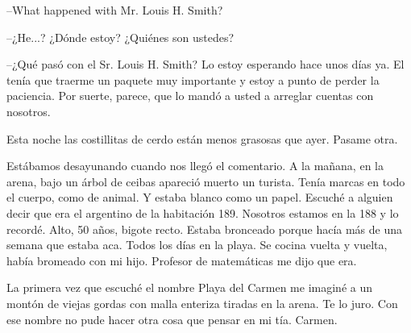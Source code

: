 \documentclass[11pt,twoside,openright,a6paper]{book}
\begin{document}
\vspace{0.5cm}
\hrulefill\hspace{0.2cm} \decofourleft\decofourright \hspace{0.2cm} \hrulefill
\vspace{0.5cm}

\---What happened with Mr. Louis H. Smith?

\---¿He...? ¿Dónde estoy? ¿Quiénes son ustedes?

\---¿Qué pasó con el Sr. Louis H. Smith? Lo estoy esperando hace
unos días ya. El tenía que traerme un paquete muy importante y estoy a
punto de perder la paciencia. Por suerte, parece, que lo mandó a usted a arreglar
cuentas con nosotros.


\vspace{0.5cm}
\hrulefill\hspace{0.2cm} \decofourleft\decofourright \hspace{0.2cm} \hrulefill
\vspace{0.5cm}

Esta noche las costillitas de cerdo están menos grasosas que ayer. Pasame
otra.


\vspace{0.5cm}
\hrulefill\hspace{0.2cm} \decofourleft\decofourright \hspace{0.2cm} \hrulefill
\vspace{0.5cm}

Estábamos desayunando cuando nos llegó el comentario. A la mañana, en la
arena, bajo un árbol de ceibas apareció muerto un turista. Tenía marcas
en todo el cuerpo, como de animal. Y estaba blanco como un papel. Escuché
a alguien decir que era el argentino de la habitación 189. Nosotros estamos
en la 188 y lo recordé. Alto, 50 años, bigote recto. Estaba bronceado
porque hacía más de una semana que estaba aca. Todos los días en la
playa. Se cocina vuelta y vuelta, había bromeado con mi hijo. Profesor de
matemáticas me dijo que era.


\vspace{0.5cm}
\hrulefill\hspace{0.2cm} \decofourleft\decofourright \hspace{0.2cm} \hrulefill
\vspace{0.5cm}

La primera vez que escuché el nombre Playa del Carmen me imaginé a un
montón de viejas gordas con malla enteriza tiradas en la arena. Te lo
juro. Con ese nombre no pude hacer otra cosa que pensar en mi tía. Carmen.
\end{document}
